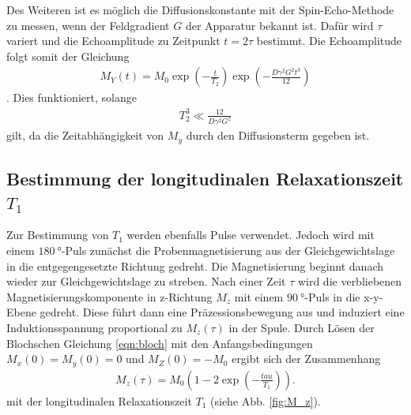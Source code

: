 Des Weiteren ist es möglich die
Diffusionskonstante mit der Spin-Echo-Methode
zu messen, wenn der Feldgradient $G$ der Apparatur bekannt ist.
Dafür wird $\tau$ variert und die Echoamplitude zu Zeitpunkt $t=2\tau$ bestimmt.
Die Echoamplitude folgt somit der Gleichung
\begin{align}
M_Y(t) = M_0\exp\left(-\frac{t}{T_2}\right)
\exp\left(-\frac{D\gamma^2 G^2 t^3}{12}\right) \label{eqn:32}
\end{align}.
Dies funktioniert, solange
\begin{align}
  T_2^3 \ll \frac{12}{D\gamma^2 G^2}
\end{align}
gilt, da die Zeitabhängigkeit von $M_y$ durch den Diffusionsterm gegeben ist.
\subsection{Bestimmung der longitudinalen Relaxationszeit $T_1$}
Zur Bestimmung von $T_1$ werden ebenfalls Pulse verwendet.
Jedoch wird mit einem $\SI{180}{\degree}$-Puls zunächst die Probenmagnetisierung
aus der Gleichgewichtslage in die entgegengesetzte
Richtung gedreht. Die Magnetisierung beginnt danach
wieder zur Gleichgewichtslage zu streben.
Nach einer Zeit $\tau$ wird
die verbliebenen Magnetisierungskomponente in z-Richtung $M_z$
mit einem $\SI{90}{\degree}$-Puls in die x-y-Ebene gedreht.
Diese führt dann eine Präzessionsbewegung aus und induziert eine
Induktionsspannung proportional zu $M_z(\tau)$ in der Spule.
Durch Lösen der Blochschen Gleichung \eqref{eqn:bloch}
mit den Anfangsbedingungen $M_x(0)=M_y(0)=0$ und $M_Z(0)=-M_0$
ergibt sich der Zusammenhang
\begin{align}
  M_z(\tau) = M_0 \left(1 - 2 \exp\left(-\frac{tau}{T_1}\right)\right). \label{eqn:33}
\end{align}
mit der longitudinalen Relaxationszeit $T_1$ (siehe Abb. \ref{fig:M_z}).

